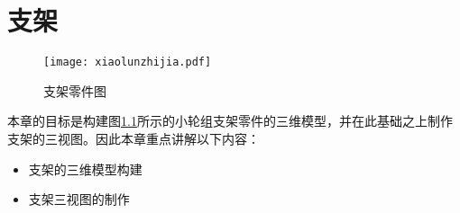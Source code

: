 \chapter{支架}
\begin{figure}[htbp]
\centering
\texttt{[image: xiaolunzhijia.pdf]}
\caption{支架零件图}\label{fig:xiaolunzhijia}
\end{figure}

本章的目标是构建图\ref{fig:xiaolunzhijia}所示的小轮组支架零件的三维模型，并在此基础之上制作支架的三视图。因此本章重点讲解以下内容：
\begin{itemize}
\item 支架的三维模型构建
\item 支架三视图的制作
\end{itemize}





\endinput